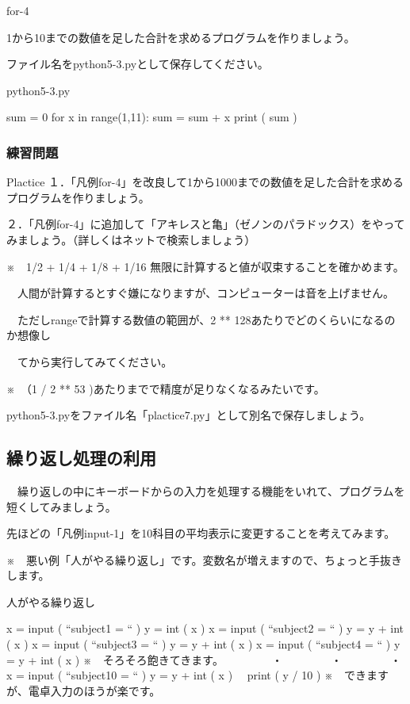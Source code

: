 \documentclass[11pt,a4paper,dvipdfmx,titlepage]{jsreport}
\begin{document}
\newpage
\begin{pabox}{for-4}

1から10までの数値を足した合計を求めるプログラムを作りましょう。

ファイル名をpython5-3.pyとして保存してください。
\begin{legbox}{python5-3.py}
\begin{listing}{1}
sum = 0
for x in range(1,11):
    sum = sum + x
print ( sum ) 
\end{listing}
\end{legbox}
\end{pabox}
\subsubsection{練習問題}
\begin{plabox}{Plactice}
１．「凡例for-4」を改良して1から1000までの数値を足した合計を求めるプログラムを作りましょう。

２．「凡例for-4」に追加して「アキレスと亀」（ゼノンのパラドックス）をやってみましょう。（詳しくはネットで検索しましょう）

※　1/2 + 1/4 + 1/8 + 1/16 無限に計算すると値が収束することを確かめます。

　人間が計算するとすぐ嫌になりますが、コンピューターは音を上げません。

　ただしrangeで計算する数値の範囲が、2 ** 128あたりでどのくらいになるのか想像し

　てから実行してみてください。

※　（1 / 2 ** 53 )あたりまでで精度が足りなくなるみたいです。

python5-3.pyをファイル名「plactice7.py」として別名で保存しましょう。


\end{plabox}

\subsection{繰り返し処理の利用}
　繰り返しの中にキーボードからの入力を処理する機能をいれて、プログラムを短くしてみましょう。

先ほどの「凡例input-1」を10科目の平均表示に変更することを考えてみます。

※　悪い例「人がやる繰り返し」です。変数名が増えますので、ちょっと手抜きします。
\newpage
\begin{grabox}{人がやる繰り返し}
\begin{listing}{1}
x = input ( “subject1 = “ )
y = int ( x ) 
x = input ( “subject2 = “ )
y = y + int ( x ) 
x = input ( “subject3 = “ )
y = y + int ( x ) 
x = input ( “subject4 = “ )
y = y + int ( x ) 
※　そろそろ飽きてきます。
　　　　・
　　　　・
　　　　・
x = input ( “subject10 = “ )
y = y + int ( x )　
print ( y / 10 )
※　できますが、電卓入力のほうが楽です。
\end{listing}
\end{grabox}
\end{document}

